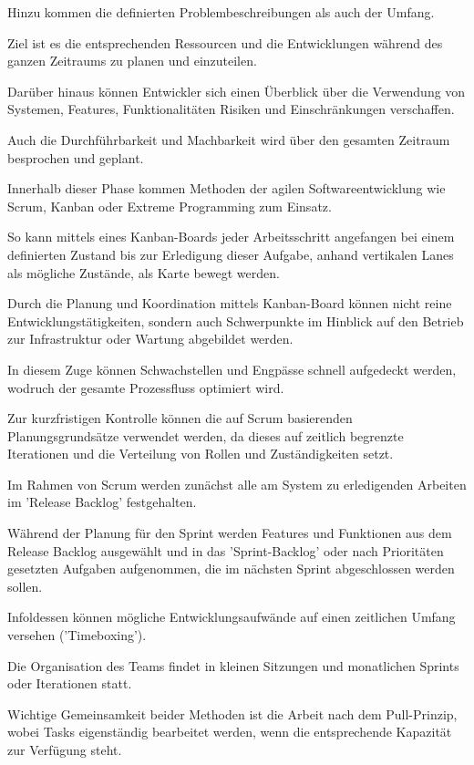Hinzu kommen die definierten Problembeschreibungen als auch der Umfang. 

Ziel ist es die entsprechenden Ressourcen und die Entwicklungen während des ganzen Zeitraums zu planen und einzuteilen. 

Darüber hinaus können Entwickler sich einen Überblick über die Verwendung von Systemen, Features, Funktionalitäten Risiken und Einschränkungen verschaffen. \cite{yarlagadda_devops_2021} 

Auch die Durchführbarkeit und Machbarkeit wird über den gesamten Zeitraum besprochen und geplant. 

Innerhalb dieser Phase kommen Methoden der agilen Softwareentwicklung wie Scrum, Kanban oder Extreme Programming zum Einsatz.

So kann mittels eines Kanban-Boards jeder Arbeitsschritt angefangen bei einem definierten Zustand bis zur Erledigung dieser Aufgabe, anhand vertikalen Lanes als mögliche Zustände, als Karte bewegt werden. \cite[S. 88]{huttermann_devops_2012}  

Durch die Planung und Koordination mittels Kanban-Board können nicht reine Entwicklungstätigkeiten, sondern auch Schwerpunkte im Hinblick auf den Betrieb zur Infrastruktur oder Wartung abgebildet werden. \cite{schaefer_devops_2017} 

In diesem Zuge können Schwachstellen und Engpässe schnell aufgedeckt werden, wodruch der gesamte Prozessfluss optimiert wird. 

Zur kurzfristigen Kontrolle können die auf Scrum basierenden Planungsgrundsätze verwendet werden, da dieses auf zeitlich begrenzte Iterationen und die Verteilung von Rollen und Zuständigkeiten setzt.

Im Rahmen von Scrum werden zunächst alle am System zu erledigenden Arbeiten im 'Release Backlog' festgehalten. 

Während der Planung für den Sprint werden Features und Funktionen aus dem Release Backlog ausgewählt und in das 'Sprint-Backlog' oder nach Prioritäten gesetzten Aufgaben aufgenommen, die im nächsten Sprint abgeschlossen werden sollen. \cite{cohen_introduction_2004}

Infoldessen können mögliche Entwicklungsaufwände auf einen zeitlichen Umfang versehen ('Timeboxing'). \cite[s. 17]{halstenberg_devops_2020}

Die Organisation des Teams findet in kleinen Sitzungen und monatlichen Sprints oder Iterationen statt. 

Wichtige Gemeinsamkeit beider Methoden ist die Arbeit nach dem Pull-Prinzip, wobei Tasks eigenständig bearbeitet werden, wenn die entsprechende Kapazität zur Verfügung steht. \cite{concas_agile_2007} 

